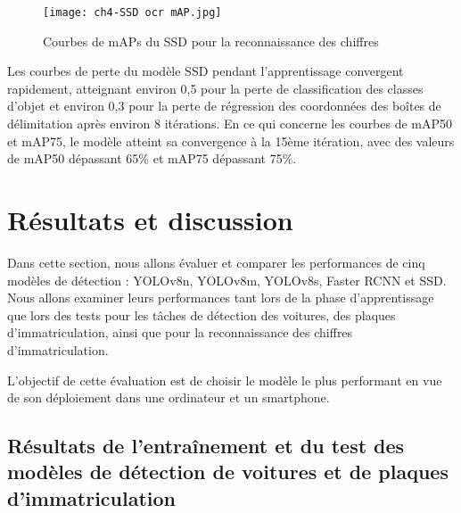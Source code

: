 \begin{figure}[H]
	\centering
	\texttt{[image: ch4-SSD ocr mAP.jpg]}
	\caption{Courbes de mAPs du SSD pour la reconnaissance des chiffres}
\label{fig:ch4-SSD ocr mAP}
\end{figure}


Les courbes de perte du modèle SSD pendant l'apprentissage convergent rapidement, atteignant environ 0,5 pour la perte de classification des classes d'objet et environ 0,3 pour la perte de régression des coordonnées des boîtes de délimitation après environ 8 itérations. En ce qui concerne les courbes de mAP50 et mAP75, le modèle atteint sa convergence à la 15ème itération, avec des valeurs de mAP50 dépassant 65\% et mAP75 dépassant 75\%.

\section{Résultats et discussion}

Dans cette section, nous allons évaluer et comparer les performances de cinq modèles de détection : YOLOv8n, YOLOv8m, YOLOv8s, Faster RCNN et SSD. Nous allons examiner leurs performances tant lors de la phase d'apprentissage que lors des tests pour les tâches de détection des voitures, des plaques d'immatriculation, ainsi que pour la reconnaissance des chiffres d'immatriculation.

L'objectif de cette évaluation est de choisir le modèle le plus performant en vue de son déploiement dans une ordinateur et un smartphone.
\subsection{Résultats de l'entraînement et du test des modèles de détection de voitures et de plaques d'immatriculation}

